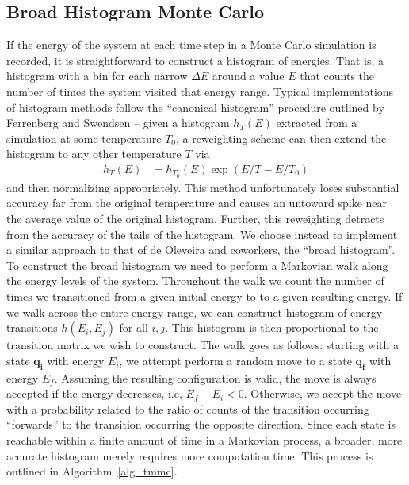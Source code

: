 \documentclass[12pt]{article}
\begin{document}
\subsection{Broad Histogram Monte Carlo}
If the energy of the system at each time step in a Monte Carlo simulation is recorded, it is straightforward to construct a histogram of energies. That is, a histogram with a bin for each narrow $\Delta E$ around a value $E$ that counts the number of times the system visited that energy range. Typical implementations of histogram methods follow the ``canonical histogram'' procedure outlined by Ferrenberg and Swendsen \cite{ferrenberg1988histogram} -- given a histogram $h_T(E)$ extracted from a simulation at some temperature $T_0$, a reweighting scheme can then extend the histogram to any other temperature $T$ via 
\begin{align}
    h_{T}(E) &= h_{T_0}(E) \exp\left(E/T - E/T_0 \right)
\end{align}
and then normalizing appropriately. This method unfortunately loses substantial accuracy far from the original temperature and causes an untoward spike near the average value of the original histogram. Further, this reweighting detracts from the accuracy of the tails of the histogram. We choose instead to implement a similar approach to that of de Oleveira and coworkers\cite{de1998broad}, the ``broad histogram''. \\

To construct the broad histogram we need to perform a Markovian walk along the energy levels of the system. Throughout the walk we count the number of times we transitioned from a given initial energy to to a given resulting energy. If we walk across the entire energy range, we can construct histogram of energy transitions $h(E_i, E_j)$ for all $i, j$. This histogram is then proportional to the transition matrix we wish to construct. The walk goes as follows: starting with a state $\mathbf{q_i}$ with energy $E_i$, we attempt perform a random move to a state $\mathbf{q_f}$ with energy $E_f$. Assuming the resulting configuration is valid, the move is always accepted if the energy decreases, i.e, $E_f - E_i <0$. Otherwise, we accept the move with a probability related to the ratio of counts of the transition occurring ``forwards'' to the transition occurring the opposite direction. Since each state is reachable within a finite amount of time in a Markovian process, a broader, more accurate histogram merely requires more computation time. This process is outlined in Algorithm~\ref{alg_tmmc}.\\
\end{document}

